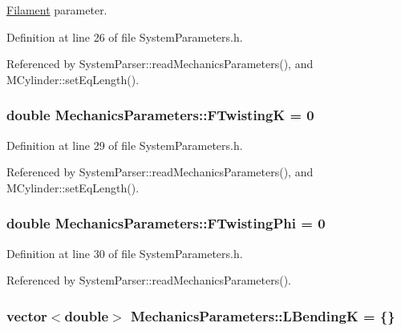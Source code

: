 \hyperlink{classFilament}{Filament} parameter. 



Definition at line 26 of file System\+Parameters.\+h.



Referenced by System\+Parser\+::read\+Mechanics\+Parameters(), and M\+Cylinder\+::set\+Eq\+Length().

\hypertarget{structMechanicsParameters_af25f0f95ebf55f3f8f02b861bf0a9b2d}{
\subsubsection[{F\+Twisting\+K}]{\setlength{\rightskip}{0pt plus 5cm}double Mechanics\+Parameters\+::\+F\+Twisting\+K = 0}}\label{structMechanicsParameters_af25f0f95ebf55f3f8f02b861bf0a9b2d}


Definition at line 29 of file System\+Parameters.\+h.



Referenced by System\+Parser\+::read\+Mechanics\+Parameters(), and M\+Cylinder\+::set\+Eq\+Length().

\hypertarget{structMechanicsParameters_ae108dda4da55a3debc21abf3fbebd3f3}{
\subsubsection[{F\+Twisting\+Phi}]{\setlength{\rightskip}{0pt plus 5cm}double Mechanics\+Parameters\+::\+F\+Twisting\+Phi = 0}}\label{structMechanicsParameters_ae108dda4da55a3debc21abf3fbebd3f3}


Definition at line 30 of file System\+Parameters.\+h.



Referenced by System\+Parser\+::read\+Mechanics\+Parameters().

\hypertarget{structMechanicsParameters_a4538f8a7ee3c71f1eda540bc41614a55}{
\subsubsection[{L\+Bending\+K}]{\setlength{\rightskip}{0pt plus 5cm}vector$<$double$>$ Mechanics\+Parameters\+::\+L\+Bending\+K = \{\}}}\label{structMechanicsParameters_a4538f8a7ee3c71f1eda540bc41614a55}


